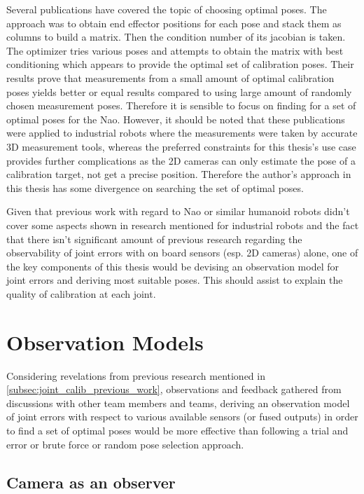 \documentclass[english, printversion, nomenclature, notitle]{tuvisionthesis} %
\begin{document}
Several publications have covered the topic of choosing optimal poses. The approach was to obtain end effector positions for each pose and stack them as columns to build a matrix. Then the condition number of its jacobian is taken. The optimizer tries various poses and attempts to obtain the matrix with best conditioning which appears to provide the optimal set of calibration poses. Their results prove that measurements from a small amount of optimal calibration poses yields better or equal results compared to using large amount of randomly chosen measurement poses. Therefore it is sensible to focus on finding for a set of optimal poses for the Nao. However, it should be noted that these publications were applied to industrial robots where the measurements were taken by accurate 3D measurement tools, whereas the preferred constraints for this thesis's use case provides further complications as the 2D cameras can only estimate the pose of a calibration target, not get a precise position. Therefore the author's approach in this thesis has some divergence on searching the set of optimal poses.

Given that previous work with regard to Nao or similar humanoid robots didn't cover some aspects shown in research mentioned for industrial robots and the fact that there isn't significant amount of previous research regarding the observability of joint errors with on board sensors (esp. 2D cameras) alone, one of the key components of this thesis would be devising an observation model for joint errors and deriving most suitable poses. This should assist to explain the quality of calibration at each joint. 

\section{Observation Models}
Considering revelations from previous research mentioned in \cref{subsec:joint_calib_previous_work}, observations and feedback gathered from discussions with other team members and teams, deriving an observation model of joint errors with respect to various available sensors (or fused outputs) in order to find a set of optimal poses would be more effective than following a trial and error or brute force or random pose selection approach.

\subsection{Camera as an observer}
\end{document}
